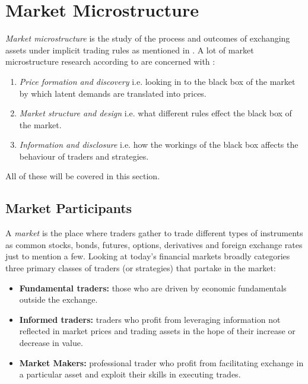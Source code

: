 \documentclass{kththesis}
\theoremstyle{definition}
\begin{document}
\section{Market Microstructure}
\textit{Market microstructure} is the study of the process and outcomes of exchanging assets under implicit trading rules as mentioned in \textcite{o1995market}. A lot of market microstructure research according to \textcite{madhavan2000market} are concerned with : 
\begin{enumerate}
    \item \textit{Price formation and discovery} i.e. looking in to the black box of the market by which latent demands are translated into prices.
    \item \textit{Market structure and design} i.e. what different rules effect the black box of the market.
    \item \textit{Information and disclosure} i.e. how the workings of the black box affects the behaviour of traders and strategies.
\end{enumerate}
All of these will be covered in this section.


\subsection{Market Participants}
A \textit{market} is the place where traders gather to trade \parencite{harris2003trading} different types of instruments as common stocks, bonds, futures, options, derivatives and foreign exchange rates just to mention a few.
Looking at today's financial markets
\textcite{cartea2015algorithmic} broadly categories three primary classes of traders (or strategies) that partake in the market:
\begin{itemize}
    \item \textbf{Fundamental traders:} those who are driven by economic fundamentals outside the exchange.
    \item \textbf{Informed traders:} traders who profit from leveraging information not reflected in market prices and trading assets in the hope of their increase or decrease in value.
    \item \textbf{Market Makers:} professional trader who profit from facilitating exchange in a particular asset and exploit their skills in executing trades.
\end{itemize}
\end{document}
